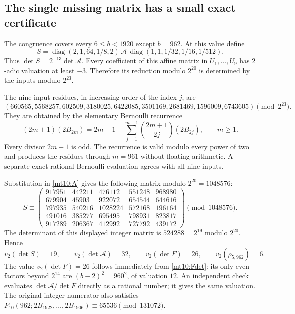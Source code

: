 \documentclass[11pt,a4paper]{article}
\numberwithin{equation}{section}
\theoremstyle{definition}
\theoremstyle{remark}
\begin{document}
\subsection{The single missing matrix has a small exact certificate}

The congruence covers every $6\le b<1920$ except $b=962$.
At this value define
\[
 S=\operatorname{diag}(2,1,64,1/8,2)\,
 \mathcal A\,\operatorname{diag}(1,1,1/32,1/16,1/512).
\]
Thus $\det S=2^{-13}\det\mathcal A$.
Every coefficient of this affine matrix in $U_1,\ldots,U_9$ has
$2$-adic valuation at least $-3$. Therefore its reduction modulo
$2^{20}$ is determined by the inputs modulo $2^{23}$.

The nine input residues, in increasing order of the index $j$, are
\[
 (660565,5568257,602509,3180025,6422085,3501169,
                         2681469,1596009,6743605)\pmod {2^{23}}.
\]
They are obtained by the elementary Bernoulli recurrence
\begin{equation}\label{mt10:Bernoulli-recurrence}
 (2m+1)(2B_{2m})
   =2m-1-\sum_{j=1}^{m-1}\binom{2m+1}{2j}(2B_{2j}),\qquad m\ge1.
\end{equation}
Every divisor $2m+1$ is odd. The recurrence is valid modulo every
power of two and produces the residues through $m=961$ without
floating arithmetic. A separate exact rational Bernoulli evaluation
agrees with all nine inputs.

Substitution in \eqref{mt10:A} gives the following matrix modulo
$2^{20}=1048576$:
\[
 S\equiv
 \begin{pmatrix}
 917951&442211&476112&551248&968980\\
 679904&45903&922072&654544&644616\\
 797935&540216&1028224&572168&196164\\
 491016&385277&695495&798931&823817\\
 917289&206367&412992&727792&439172
 \end{pmatrix}\pmod {1048576}.
\]
The determinant of this displayed integer matrix is
$524288=2^{19}$ modulo $2^{20}$. Hence
\[
 v_2(\det S)=19,\qquad
 v_2(\det\mathcal A)=32,\qquad
 v_2(\det F)=26,\qquad v_2(\rho_{5,962})=6.
\]
The value $v_2(\det F)=26$ follows immediately from
\eqref{mt10:Fdet}: its only even factors beyond $2^{14}$ are
$(b-2)^2=960^2$, of valuation $12$.
An independent check evaluates $\det\mathcal A/\det F$ directly
as a rational number; it gives the same valuation. The original
integer numerator also satisfies
$P_{10}(962;2B_{1922},\ldots,2B_{1906})\equiv65536\pmod {131072}$.
\end{document}
